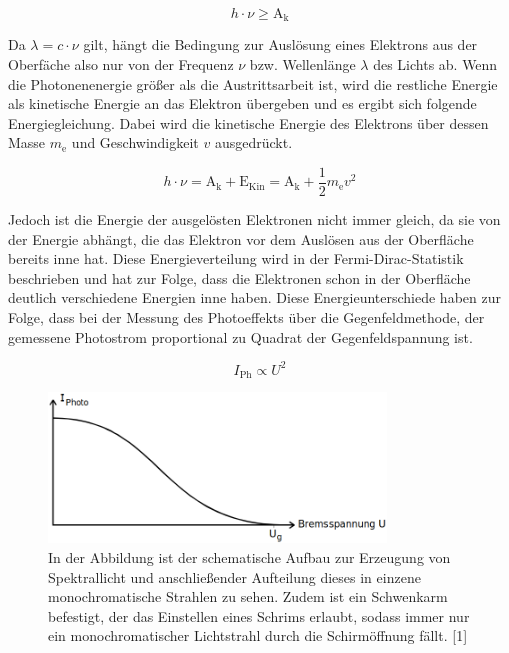 \documentclass[titlepage = firstcover]{scrartcl}
\begin{document}
        \begin{equation*}
            h \cdot \nu \geqslant \text{A}_{\text{k}}
        \end{equation*}

        \noindent
        Da $\lambda = c \cdot \nu$ gilt, hängt die Bedingung zur Auslösung eines Elektrons aus der Oberfäche also nur von der Frequenz $\nu$ bzw. Wellenlänge $\lambda$ des Lichts ab. Wenn die 
        Photonenenergie größer als die Austrittsarbeit ist, wird die restliche Energie als kinetische Energie an das Elektron übergeben und es ergibt sich folgende Energiegleichung. 
        Dabei wird die kinetische Energie des Elektrons über dessen Masse $m_{\text{e}}$ und Geschwindigkeit $v$ ausgedrückt.
        
        \begin{equation}
            h \cdot \nu = \text{A}_{\text{k}} + \text{E}_{\text{Kin}} = \text{A}_{\text{k}} + \frac{1}{2} m_{\text{e}}v^2
            \label{eqn:Energiegleichung}
        \end{equation}

        \noindent
        Jedoch ist die Energie der ausgelösten Elektronen nicht immer gleich, da sie von der Energie abhängt, die das Elektron vor dem Auslösen aus der Oberfläche bereits inne hat. Diese 
        Energieverteilung wird in der Fermi-Dirac-Statistik beschrieben und hat zur Folge, dass die Elektronen schon in der Oberfläche deutlich verschiedene Energien inne haben. Diese 
        Energieunterschiede haben zur Folge, dass bei der Messung des Photoeffekts über die Gegenfeldmethode, der gemessene Photostrom proportional zu Quadrat der Gegenfeldspannung ist. 

        \begin{equation*}
            I_{\text{Ph}} \propto U^2
        \end{equation*}

        \FloatBarrier

                \begin{figure}[h]
                  \centering
                  \includegraphics[width = 0.8\textwidth]{Bilder/IUTheorie.png}
                  \caption{In der Abbildung ist der schematische Aufbau zur Erzeugung von Spektrallicht und anschließender Aufteilung dieses in einzene monochromatische Strahlen zu sehen. Zudem ist ein Schwenkarm befestigt, der das Einstellen eines Schrims erlaubt, sodass immer nur ein monochromatischer Lichtstrahl durch die Schirmöffnung fällt. [1]}
                  \label{fig:IUTheorie}
                \end{figure}
\end{document}

